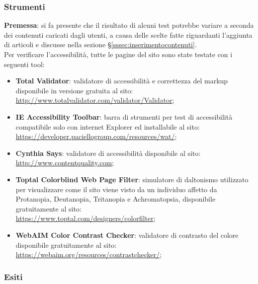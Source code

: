 \documentclass[12pt]{article}
\begin{document}
	\subsubsection{Strumenti}
	
	\textbf{Premessa}: si fa presente che il risultato di alcuni test potrebbe variare a seconda dei contenuti caricati dagli utenti, a causa delle scelte fatte riguardanti l'aggiunta di articoli e discusse nella sezione §\ref{sssec:inserimentocontenuti}.\\
	
	\noindent Per verificare l'accessibilità, tutte le pagine del sito sono state testate con i seguenti tool:
	
	\begin{itemize}
		\item \textbf{Total Validator}: validatore di accessibilità e correttezza del markup disponibile in versione gratuita al sito:
		\\ \url{http://www.totalvalidator.com/validator/Validator};
		
		\item \textbf{IE Accessibility Toolbar}: barra di strumenti per test di accessibilità compatibile solo con internet Explorer ed installabile al sito:
		\\ \url{https://developer.paciellogroup.com/resources/wat/};
		
		\item \textbf{Cynthia Says}: validatore di accessibilità disponibile al sito: 
		\\ \url{http://www.contentquality.com};
		
		\item \textbf{Toptal Colorblind Web Page Filter}: simulatore di daltonismo utilizzato per visualizzare come il sito viene visto da un individuo affetto da Protanopia, Deutanopia, Tritanopia e Achromatopsia, disponibile gratuitamente al sito: 
		\\ \url{https://www.toptal.com/designers/colorfilter};
		
		\item \textbf{WebAIM Color Contrast Checker}: validatore di contrasto del colore disponibile gratuitamente al sito: 
		\\ \url{https://webaim.org/resources/contrastchecker/};
	\end{itemize}
	
	\subsubsection{Esiti}
	
\end{document}
